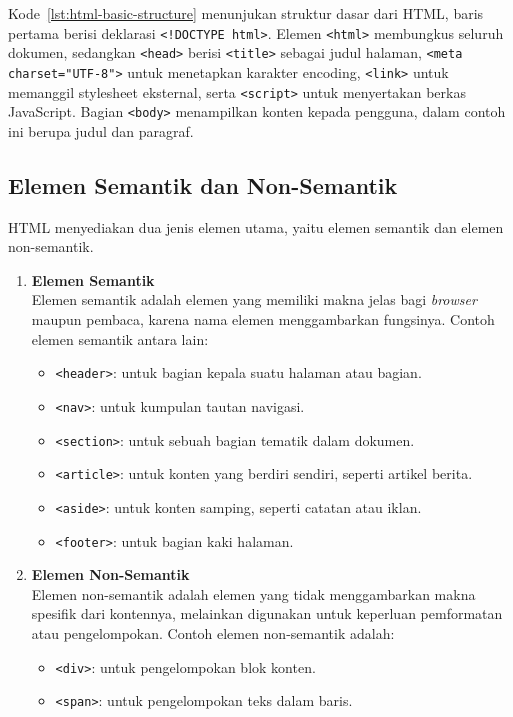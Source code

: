 Kode~\ref{lst:html-basic-structure} menunjukan struktur dasar dari HTML, baris pertama berisi deklarasi \texttt{<!DOCTYPE html>}. Elemen \texttt{<html>} membungkus seluruh dokumen, sedangkan \texttt{<head>} berisi \texttt{<title>} sebagai judul halaman, \texttt{<meta charset="UTF-8">} untuk menetapkan karakter encoding, \texttt{<link>} untuk memanggil stylesheet eksternal, serta \texttt{<script>} untuk menyertakan berkas JavaScript. Bagian \texttt{<body>} menampilkan konten kepada pengguna, dalam contoh ini berupa judul dan paragraf.

\subsection{Elemen Semantik dan Non-Semantik}
\label{subsec:0224-elemen-semantik-dan-non-semantik}

HTML menyediakan dua jenis elemen utama, yaitu elemen semantik dan elemen non-semantik.

\begin{enumerate}
    \item \textbf{Elemen Semantik} \\
    Elemen semantik adalah elemen yang memiliki makna jelas bagi \textit{browser} maupun pembaca, karena nama elemen menggambarkan fungsinya. Contoh elemen semantik antara lain:
    \begin{itemize}
        \item \texttt{<header>}: untuk bagian kepala suatu halaman atau bagian.
        \item \texttt{<nav>}: untuk kumpulan tautan navigasi.
        \item \texttt{<section>}: untuk sebuah bagian tematik dalam dokumen.
        \item \texttt{<article>}: untuk konten yang berdiri sendiri, seperti artikel berita.
        \item \texttt{<aside>}: untuk konten samping, seperti catatan atau iklan.
        \item \texttt{<footer>}: untuk bagian kaki halaman.
    \end{itemize}

    \item \textbf{Elemen Non-Semantik} \\
    Elemen non-semantik adalah elemen yang tidak menggambarkan makna spesifik dari kontennya, melainkan digunakan untuk keperluan pemformatan atau pengelompokan. Contoh elemen non-semantik adalah:
    \begin{itemize}
        \item \texttt{<div>}: untuk pengelompokan blok konten.
        \item \texttt{<span>}: untuk pengelompokan teks dalam baris.
    \end{itemize}
\end{enumerate}  

